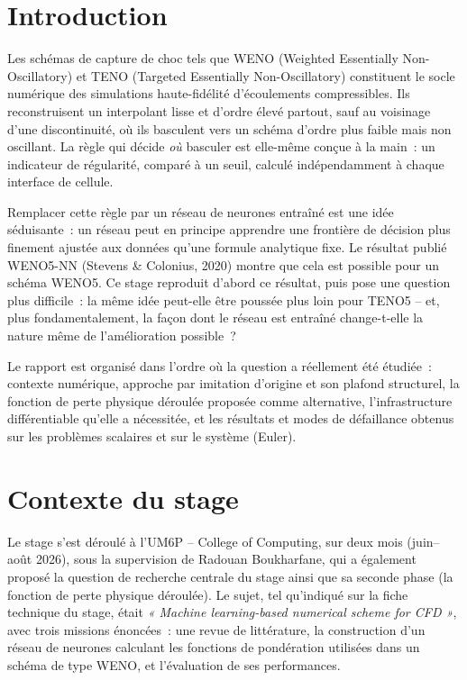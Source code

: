 \documentclass[11pt]{article}
\begin{document}
\section{Introduction}

Les schémas de capture de choc tels que WENO (Weighted Essentially
Non-Oscillatory) et TENO (Targeted Essentially Non-Oscillatory)
constituent le socle numérique des simulations haute-fidélité
d'écoulements compressibles. Ils reconstruisent un interpolant lisse et
d'ordre élevé partout, sauf au voisinage d'une discontinuité, où ils
basculent vers un schéma d'ordre plus faible mais non oscillant. La règle
qui décide \emph{où} basculer est elle-même conçue à la main~: un
indicateur de régularité, comparé à un seuil, calculé indépendamment à
chaque interface de cellule.

Remplacer cette règle par un réseau de neurones entraîné est une idée
séduisante~: un réseau peut en principe apprendre une frontière de
décision plus finement ajustée aux données qu'une formule analytique fixe.
Le résultat publié WENO5-NN (Stevens \& Colonius, 2020) montre que cela
est possible pour un schéma WENO5. Ce stage reproduit d'abord ce résultat,
puis pose une question plus difficile~: la même idée peut-elle être
poussée plus loin pour TENO5 -- et, plus fondamentalement, la façon dont le
réseau est entraîné change-t-elle la nature même de l'amélioration
possible~?

Le rapport est organisé dans l'ordre où la question a réellement été
étudiée~: contexte numérique, approche par imitation d'origine et son
plafond structurel, la fonction de perte physique déroulée proposée comme
alternative, l'infrastructure différentiable qu'elle a nécessitée, et les
résultats et modes de défaillance obtenus sur les problèmes scalaires et
sur le système (Euler).

\section{Contexte du stage}

Le stage s'est déroulé à l'UM6P -- College of Computing, sur deux mois
(juin--août 2026), sous la supervision de Radouan Boukharfane, qui a
également proposé la question de recherche centrale du stage ainsi que sa
seconde phase (la fonction de perte physique déroulée). Le sujet, tel
qu'indiqué sur la fiche technique du stage, était \emph{« Machine
learning-based numerical scheme for CFD »}, avec trois missions
énoncées~: une revue de littérature, la construction d'un réseau de
neurones calculant les fonctions de pondération utilisées dans un schéma
de type WENO, et l'évaluation de ses performances.
\end{document}
